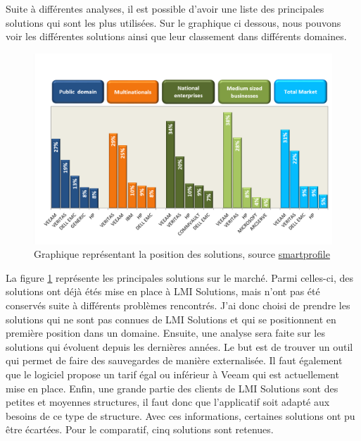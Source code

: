 \documentclass[pfe]{tnreport} %
\begin{document}
Suite à différentes analyses, il est possible d'avoir une liste des principales solutions qui sont les plus utilisées. Sur le graphique ci dessous, nous pouvons voir les différentes solutions ainsi que leur classement dans différents domaines. 
\begin{figure}[ht]
 \centering
 \includegraphics[width=15cm]{figures/Backup.png}
 \caption{Graphique représentant la position des solutions, source
 \href{https://www.smartprofile.io/analytics-papers/veeam-big-winner-in-back-up-software/}{smartprofile}}
 \label{fig:backup_state}
\end{figure}

La figure \ref{fig:backup_state} représente les principales solutions sur le marché. Parmi celles-ci, des solutions ont déjà étés mise en place à LMI Solutions, mais n'ont pas été conservés suite à différents problèmes rencontrés. \newline
J'ai donc choisi de prendre les solutions qui ne sont pas connues de LMI Solutions et qui se positionnent en première position dans un domaine. \newline
Ensuite, une analyse sera faite sur les solutions qui évoluent depuis les dernières années. \newline
Le but est de trouver un outil qui permet de faire des sauvegardes de manière externalisée. Il faut également que le logiciel propose un tarif égal ou inférieur à Veeam qui est actuellement mise en place. \newline
Enfin, une grande partie des clients de LMI Solutions sont des petites et moyennes structures, il faut donc que l'applicatif soit adapté aux besoins de ce type de structure. \newline
Avec ces informations, certaines solutions ont pu être écartées. Pour le comparatif, cinq solutions sont retenues. \newline
\end{document}
